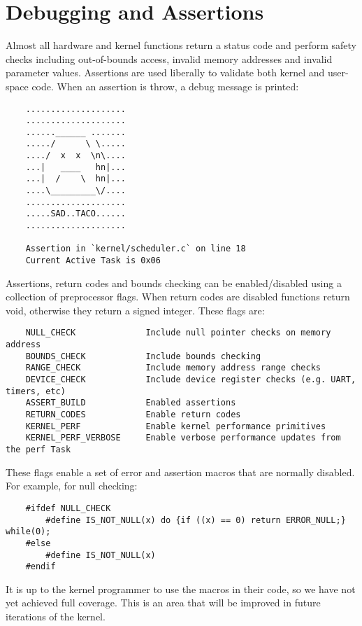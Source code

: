 \documentclass[twoside,a4paper]{refart}
\begin{document}
\section{Debugging and Assertions}
 Almost all hardware and kernel functions return a status code and perform safety checks including out-of-bounds access, invalid memory addresses and invalid parameter values. Assertions are used liberally to validate both kernel and user-space code. When an assertion is throw, a debug message is printed:

\begin{verbatim}
    ....................
    ....................
    ......______ .......
    ...../      \ \.....
    ..../  x  x  \n\....
    ...|   ____   hn|...
    ...|  /    \  hn|...
    ....\_________\/....
    ....................
    .....SAD..TACO......
    ....................

    Assertion in `kernel/scheduler.c` on line 18
    Current Active Task is 0x06
\end{verbatim}

Assertions, return codes and bounds checking can be enabled/disabled using a collection of preprocessor flags. When return codes are disabled functions return void, otherwise they return a signed integer. These flags are:\\
\begin{verbatim}
    NULL_CHECK              Include null pointer checks on memory address
    BOUNDS_CHECK            Include bounds checking
    RANGE_CHECK             Include memory address range checks
    DEVICE_CHECK            Include device register checks (e.g. UART, timers, etc)
    ASSERT_BUILD            Enabled assertions
    RETURN_CODES            Enable return codes
    KERNEL_PERF             Enable kernel performance primitives
    KERNEL_PERF_VERBOSE     Enable verbose performance updates from the perf Task
\end{verbatim}

These flags enable a set of error and assertion macros that are normally disabled. For example, for null checking:

\begin{verbatim}
    #ifdef NULL_CHECK
        #define IS_NOT_NULL(x) do {if ((x) == 0) return ERROR_NULL;} while(0);
    #else
        #define IS_NOT_NULL(x)
    #endif
\end{verbatim}

It is up to the kernel programmer to use the macros in their code, so we have not yet achieved full coverage. This is an area that will be improved in future iterations of the kernel.
\end{document}
